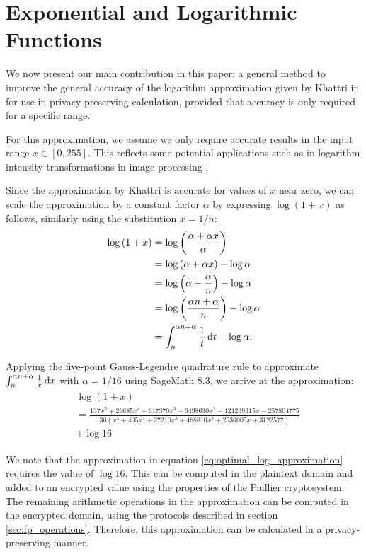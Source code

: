\section{Exponential and Logarithmic Functions}
We now present our main contribution in this paper: a general method to improve the general accuracy of the logarithm approximation given by Khattri in \cite{khattri_new_2009} for use in privacy-preserving calculation, provided that accuracy is only required for a specific range.

For this approximation, we assume we only require accurate results in the input range $x \in [0, 255]$. This reflects some potential applications such as in logarithm intensity transformations in image processing \cite{gonzalez_digital_2008}.

Since the approximation by Khattri is accurate for values of $x$ near zero, we can scale the approximation by a constant factor $\alpha$ by expressing $\log(1+x)$ as follows, similarly using the substitution $x=1/n$:
\begin{align*}
	\log{(1+x)} &= \log{\left(\frac{\alpha + \alpha x}{\alpha}\right)}\\
	&= \log{(\alpha + \alpha x)} - \log{\alpha}\\
	&= \log{\left(\alpha+\frac{\alpha}{n}\right)} - \log{\alpha}\\
	&= \log{\left(\frac{\alpha n + \alpha}{n}\right)} - \log{\alpha}\\
	&= \int_{n}^{\alpha n + \alpha}{\frac{1}{t}\mathop{}\!\mathrm{d} t} - \log{\alpha}.
\end{align*}

Applying the five-point Gauss-Legendre quadrature rule to approximate $\int_{n}^{\alpha n + \alpha}{\frac{1}{x}\mathop{}\!\mathrm{d} x}$ with $\alpha = 1/16$ using SageMath 8.3, we arrive at the approximation:
\begin{align}\label{eq:optimal_log_approximation}
	\begin{split}
		&\log(1+x) \\
		&=\frac{137x^5 + 26685x^4 + 617370x^3 - 6498630x^2 - 121239315x - 257804775}
		{30(x^5 + 405x^4 + 27210x^3 + 488810x^2 + 2536005x + 3122577)}\\
		&+ \log{16}
	\end{split}
\end{align}

We note that the approximation in equation \ref{eq:optimal_log_approximation} requires the value of $\log{16}$. This can be computed in the plaintext domain and added to an encrypted value using the properties of the Paillier cryptosystem. The remaining arithmetic operations in the approximation can be computed in the encrypted domain, using the protocols described in section \ref{sec:fp_operations}. Therefore, this approximation can be calculated in a privacy-preserving manner.

